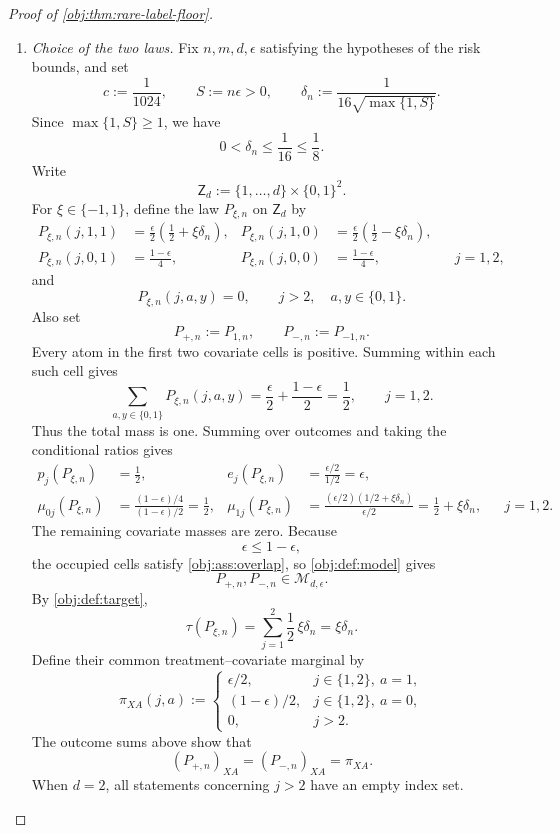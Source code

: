 \begin{proof}[Proof of \cref{obj:thm:rare-label-floor}]
\begin{enumerate}
\item \textit{Choice of the two laws.}
Fix \(n,m,d,\epsilon\) satisfying the hypotheses of the risk bounds, and set
\[
c:=\frac1{1024},
\qquad
S:=n\epsilon>0,
\qquad
\delta_n:=\frac1{16\sqrt{\max\{1,S\}}}.
\]
Since \(\max\{1,S\}\ge1\), we have
\[
0<\delta_n\le\frac1{16}\le\frac18.
\]
Write
\[
\mathsf Z_d:=\{1,\ldots,d\}\times\{0,1\}^2.
\]
For \(\xi\in\{-1,1\}\), define the law \(P_{\xi,n}\) on \(\mathsf Z_d\) by
\[
\begin{aligned}
P_{\xi,n}(j,1,1)&=\frac{\epsilon}{2}\left(\frac12+\xi\delta_n\right),&
P_{\xi,n}(j,1,0)&=\frac{\epsilon}{2}\left(\frac12-\xi\delta_n\right),\\
P_{\xi,n}(j,0,1)&=\frac{1-\epsilon}{4},&
P_{\xi,n}(j,0,0)&=\frac{1-\epsilon}{4},
&&j=1,2,
\end{aligned}
\]
and
\[
P_{\xi,n}(j,a,y)=0,
\qquad j>2,\quad a,y\in\{0,1\}.
\]
Also set
\[
P_{+,n}:=P_{1,n},
\qquad
P_{-,n}:=P_{-1,n}.
\]
Every atom in the first two covariate cells is positive. Summing within each such cell gives
\[
\sum_{a,y\in\{0,1\}}P_{\xi,n}(j,a,y)
=
\frac{\epsilon}{2}+\frac{1-\epsilon}{2}
=\frac12,
\qquad j=1,2.
\]
Thus the total mass is one. Summing over outcomes and taking the conditional ratios gives
\[
\begin{aligned}
p_j(P_{\xi,n})&=\frac12,
&
e_j(P_{\xi,n})&=\frac{\epsilon/2}{1/2}=\epsilon,\\
\mu_{0j}(P_{\xi,n})&=
\frac{(1-\epsilon)/4}{(1-\epsilon)/2}=\frac12,
&
\mu_{1j}(P_{\xi,n})&=
\frac{(\epsilon/2)(1/2+\xi\delta_n)}{\epsilon/2}
=\frac12+\xi\delta_n,
&&j=1,2.
\end{aligned}
\]
The remaining covariate masses are zero. Because
\[
\epsilon\le1-\epsilon,
\]
the occupied cells satisfy \cref{obj:ass:overlap}, so \cref{obj:def:model} gives
\[
P_{+,n},P_{-,n}\in\mathcal M_{d,\epsilon}.
\]
By \cref{obj:def:target},
\[
\tau(P_{\xi,n})
=
\sum_{j=1}^{2}\frac12\,\xi\delta_n
=\xi\delta_n.
\]
Define their common treatment--covariate marginal by
\[
\pi_{XA}(j,a):=
\begin{cases}
\epsilon/2,&j\in\{1,2\},\ a=1,\\
(1-\epsilon)/2,&j\in\{1,2\},\ a=0,\\
0,&j>2.
\end{cases}
\]
The outcome sums above show that
\[
(P_{+,n})_{XA}=(P_{-,n})_{XA}=\pi_{XA}.
\]
When \(d=2\), all statements concerning \(j>2\) have an empty index set.


\end{enumerate}
\end{proof}
